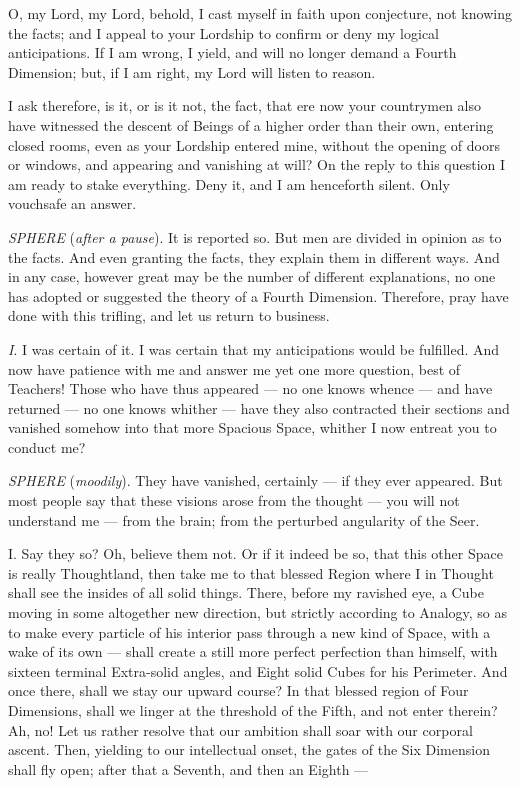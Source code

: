 \documentclass[10pt, kindle, oneside]{kindle}
\begin{document}
O, my Lord, my Lord, behold, I cast myself in faith upon conjecture, not
knowing the facts; and I appeal to your Lordship to confirm or deny my logical
anticipations. If I am wrong, I yield, and will no longer demand a Fourth
Dimension; but, if I am right, my Lord will listen to reason.

I ask therefore, is it, or is it not, the fact, that ere now your countrymen
also have witnessed the descent of Beings of a higher order than their own,
entering closed rooms, even as your Lordship entered mine, without the opening
of doors or windows, and appearing and vanishing at will? On the reply to this
question I am ready to stake everything. Deny it, and I am henceforth silent.
Only vouchsafe an answer.

\emph{SPHERE} (\emph{after a pause}). It is reported so. But men are divided in opinion as
to the facts. And even granting the facts, they explain them in different
ways. And in any case, however great may be the number of different
explanations, no one has adopted or suggested the theory of a Fourth
Dimension. Therefore, pray have done with this trifling, and let us return to
business.

\emph{I}. I was certain of it. I was certain that my anticipations would be
fulfilled. And now have patience with me and answer me yet one more question,
best of Teachers! Those who have thus appeared --- no one knows whence --- and
have returned --- no one knows whither --- have they also contracted their
sections and vanished somehow into that more Spacious Space, whither I now
entreat you to conduct me?

\emph{SPHERE} (\emph{moodily}). They have vanished, certainly --- if they ever appeared. But
most people say that these visions arose from the thought --- you will not
understand me --- from the brain; from the perturbed angularity of the Seer.

I. Say they so? Oh, believe them not. Or if it indeed be so, that this other
Space is really Thoughtland, then take me to that blessed Region where I in
Thought shall see the insides of all solid things. There, before my ravished
eye, a Cube moving in some altogether new direction, but strictly according to
Analogy, so as to make every particle of his interior pass through a new kind
of Space, with a wake of its own --- shall create a still more perfect
perfection than himself, with sixteen terminal Extra-solid angles, and Eight
solid Cubes for his Perimeter. And once there, shall we stay our upward
course? In that blessed region of Four Dimensions, shall we linger at the
threshold of the Fifth, and not enter therein? Ah, no! Let us rather resolve
that our ambition shall soar with our corporal ascent. Then, yielding to our
intellectual onset, the gates of the Six Dimension shall fly open; after that
a Seventh, and then an Eighth ---
\end{document}
